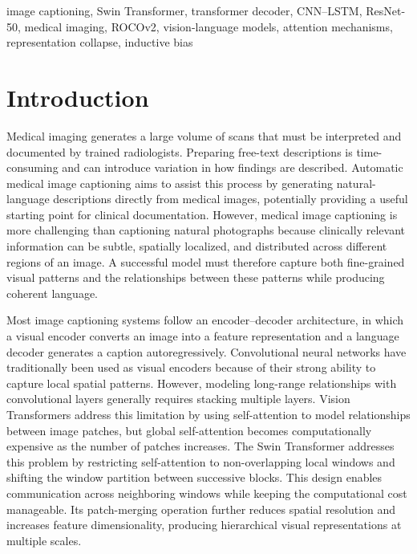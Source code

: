\documentclass[conference]{IEEEtran}
\begin{document}
\begin{IEEEkeywords}
image captioning, Swin Transformer, transformer decoder, CNN--LSTM, ResNet-50, medical imaging, ROCOv2, vision-language models, attention mechanisms, representation collapse, inductive bias
\end{IEEEkeywords}

\section{Introduction}
\label{sec:intro}

Medical imaging generates a large volume of scans that must be interpreted and documented by trained radiologists. Preparing free-text descriptions is time-consuming and can introduce variation in how findings are described. Automatic medical image captioning aims to assist this process by generating natural-language descriptions directly from medical images, potentially providing a useful starting point for clinical documentation. However, medical image captioning is more challenging than captioning natural photographs because clinically relevant information can be subtle, spatially localized, and distributed across different regions of an image. A successful model must therefore capture both fine-grained visual patterns and the relationships between these patterns while producing coherent language.

Most image captioning systems follow an encoder--decoder architecture, in which a visual encoder converts an image into a feature representation and a language decoder generates a caption autoregressively. Convolutional neural networks have traditionally been used as visual encoders because of their strong ability to capture local spatial patterns. However, modeling long-range relationships with convolutional layers generally requires stacking multiple layers. Vision Transformers address this limitation by using self-attention to model relationships between image patches, but global self-attention becomes computationally expensive as the number of patches increases. The Swin Transformer addresses this problem by restricting self-attention to non-overlapping local windows and shifting the window partition between successive blocks. This design enables communication across neighboring windows while keeping the computational cost manageable. Its patch-merging operation further reduces spatial resolution and increases feature dimensionality, producing hierarchical visual representations at multiple scales.
\end{document}
